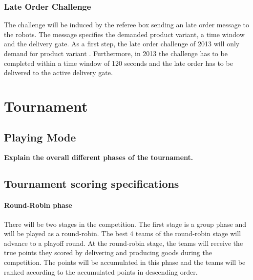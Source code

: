 \documentclass[12pt,twoside]{article}
\begin{document}
\subsubsection{Late Order Challenge}

The challenge will be induced by the referee box sending an late order
message to the robots. The message specifies the demanded product
variant, a time window and the delivery gate. As a first step, the late
order challenge of 2013 will only demand for product variant
. Furthermore, in 2013 the challenge has to be completed within a
time window of 120 seconds and the late order has to be delivered to
the active delivery gate. 

\section{Tournament}
\label{sec:tournament}
\subsection{Playing Mode}
\textbf{Explain the overall different phases of the tournament.}

\subsection{Tournament scoring specifications}


\paragraph{Round-Robin phase} 
There will be two stages in the competition. The first stage is a
group phase and will be played as a round-robin. The best 4 teams of
the round-robin stage will advance to a playoff round.
%
At the round-robin stage, the teams will  receive the true points
they scored by delivering and producing goods during the
competition. The points will be accumulated in this phase and the
teams will be ranked according to the accumulated points in descending
order.
\end{document}
